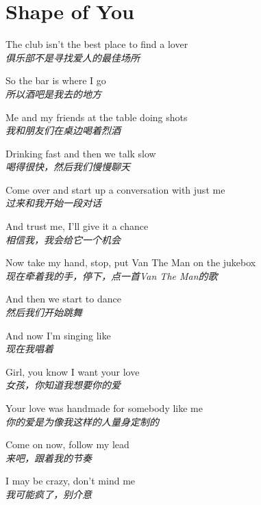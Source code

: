 \section{Shape of You}

\thispagestyle{empty}


\begin{spacing}{1.5}
\begin{flushleft}
The club isn't the best place to find a lover\\
\textit{俱乐部不是寻找爱人的最佳场所}\lyricspace

So the bar is where I go\\
\textit{所以酒吧是我去的地方}\lyricspace

Me and my friends at the table doing shots\\
\textit{我和朋友们在桌边喝着烈酒}\lyricspace

Drinking fast and then we talk slow\\
\textit{喝得很快，然后我们慢慢聊天}\lyricspace

Come over and start up a conversation with just me\\
\textit{过来和我开始一段对话}\lyricspace

And trust me, I'll give it a chance\\
\textit{相信我，我会给它一个机会}\lyricspace

Now take my hand, stop, put Van The Man on the jukebox\\
\textit{现在牵着我的手，停下，点一首Van The Man的歌}\lyricspace

And then we start to dance\\
\textit{然后我们开始跳舞}\lyricspace

And now I'm singing like\\
\textit{现在我唱着}\lyricspace

Girl, you know I want your love\\
\textit{女孩，你知道我想要你的爱}\lyricspace

Your love was handmade for somebody like me\\
\textit{你的爱是为像我这样的人量身定制的}\lyricspace

Come on now, follow my lead\\
\textit{来吧，跟着我的节奏}\lyricspace

I may be crazy, don't mind me\\
\textit{我可能疯了，别介意}\lyricspace


\end{flushleft}
\end{spacing}
